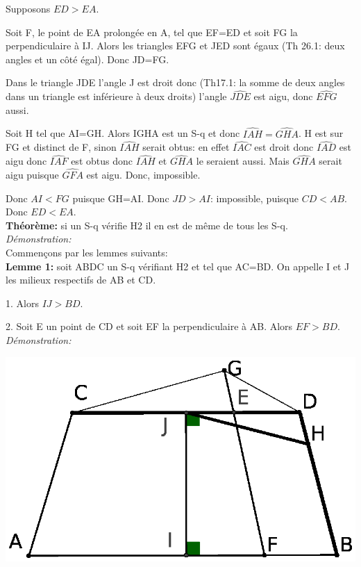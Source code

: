 \documentclass[a4paper, 12pt, twoside]{book}
\begin{document}
    Supposons $ED>EA$.\
    
    Soit F, le point de EA prolongée en A, tel que EF=ED et soit FG la perpendiculaire à IJ. Alors les triangles EFG et JED sont égaux (Th 26.1: deux angles et un côté égal). Donc JD=FG.\
    
    Dans le triangle JDE l'angle J est droit donc (Th17.1: la somme de deux angles dans un triangle est inférieure à deux droits) l'angle $\hat{JDE}$ est aigu, donc $\hat{EFG}$ aussi.\
    
    Soit H tel que AI=GH. Alors IGHA est un S-q et donc $\hat{IAH}=\hat{GHA}$. H est sur FG et distinct de F, sinon $\hat{IAH}$ serait obtus: en effet $\hat{IAC}$ est droit donc $\hat{IAD}$ est aigu donc $\hat{IAF}$ est obtus donc $\hat{IAH}$ et $\hat{GHA}$ le seraient aussi. Mais $\hat{GHA}$ serait aigu puisque $\hat{GFA}$ est aigu. Donc, impossible.\
    
    Donc $AI<FG$ puisque GH=AI. Donc $JD>AI$: impossible, puisque $CD<AB$. Donc $ED<EA$.\\
    
   

\newpage \textbf{Théorème:} si un S-q vérifie H2 il en est de même  de tous les S-q.\\

\textit{Démonstration:}\\

Commençons par les lemmes suivants:\\

\textbf{Lemme 1:} soit ABDC un S-q vérifiant H2 et tel que AC=BD. On appelle I et J les milieux respectifs de AB et CD.\

1. Alors $IJ>BD$.\

2. Soit E un point de CD et soit EF la perpendiculaire à AB. Alors $EF>BD$.\\

\textit{Démonstration:}\

 \includegraphics[scale=0.7]{figures/sacc134.eps}\\ 
 
\end{document}
